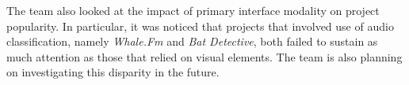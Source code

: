 \documentclass{sigchi}
\begin{document}

The team also looked at the impact of primary interface modality on project popularity.  In particular, it was noticed that projects that involved use of audio classification, namely \emph{Whale.Fm} and \emph{Bat Detective}, both failed to sustain as much attention as those that relied on visual elements.  The team is also planning on investigating this disparity in the future.






\end{document}
